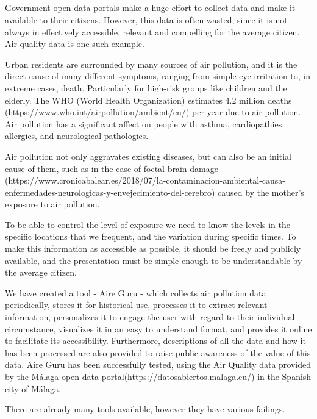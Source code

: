 \subsection*{}
Government open data portals make a huge effort to collect data and make it available to their citizens.
However, this data is often wasted, since it is not always in effectively accessible, relevant and compelling
for the average citizen. Air quality data is one such example.

Urban residents are surrounded by many sources of air pollution, and it is the direct cause of many different symptoms,
ranging from simple eye irritation 
to, in extreme cases, death. Particularly for high-risk groups like children and the elderly.
The WHO (World Health Organization) estimates 4.2 million deaths
(https://www.who.int/airpollution/ambient/en/) per year due to air pollution.
Air pollution has a significant affect on people with asthma, cardiopathies, allergies, and neurological pathologies.

Air pollution not only aggravates existing diseases, but can also be an initial cause of them, such as in the case of foetal brain
damage (https://www.cronicabalear.es/2018/07/la-contaminacion-ambiental-causa-enfermedades-neurologicas-y-envejecimiento-del-cerebro)
caused by the mother's exposure to air pollution.

To be able to control the level of exposure we need to know the levels
in the specific locations that we frequent, and the variation during specific times.
To make this information as accessible as possible, it should be freely and publicly available, and the presentation
must be simple enough to be understandable by the average citizen.

We have created a tool - Aire Guru - which collects air pollution data periodically, stores it for historical use, 
processes it to extract relevant information, personalizes it to engage the user with regard to their individual
circumstance, visualizes it in an easy to understand format, and provides it online to facilitate its accessibility. Furthermore,
descriptions of all the data and how it has been processed are also provided to raise public awareness of the value
of this data. Aire Guru has been successfully tested, using the Air Quality data provided
by the Málaga open data portal(https://datosabiertos.malaga.eu/) in the Spanish city of Málaga.

There are already many tools available, however they have various failings.

